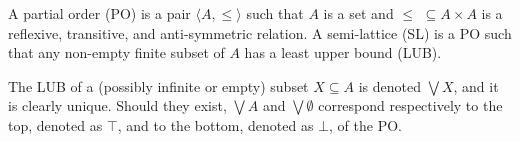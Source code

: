 \documentclass{llncs}
\newcommand{\comment}[1]{}
\def\monid{{\mathbf 0}}
\def\monid{\mathbf{1}}
\begin{document}
\begin{definition}[Orders]
	A partial order (PO) is a pair $\langle A, \leq \rangle$ such that
	$A$ is a set %
	and $\leq \,\,\subseteq A \times A$ is a reflexive, transitive, and
	anti-symmetric  relation.
	A semi-lattice (SL) is a PO
	such that any non-empty finite subset of $A$ has a least upper bound (LUB).
\end{definition}

The LUB of a (possibly infinite or empty) subset $X \subseteq A$ is denoted $\bigvee X$, and it is clearly unique.
Should  they exist, $\bigvee A$ and $\bigvee \emptyset$ correspond respectively to the top, denoted as 
$\top$, and to the bottom, denoted as $\bot$, of the PO.

\comment{\begin{definition}[Compact elements]
An element $a \in A$ is compact 
if whenever $a \leq \bigvee Y$ for some $Y \subseteq A$
there exists a finite subset
$X \subseteq Y$ such that $a \leq \bigvee X$.
%
\end{definition}

We let $A^C \subseteq A$ denote the set of compact elements of ${\mathbb C}$. }

%



%
%
\end{document}
